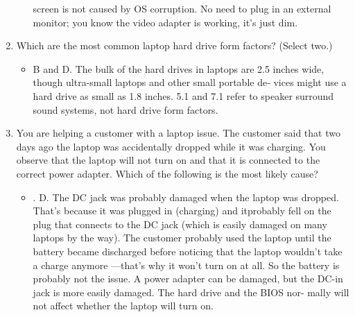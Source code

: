 \documentclass{article}
\begin{document}
\begin{enumerate}
\begin{itemize}
screen is not caused by OS corruption. No need to plug in an
external monitor; you know the video adapter is working, it’s
just dim.
     \end{itemize}
     \item Which are the most common laptop hard drive form factors?
(Select two.)
     \begin{itemize}
         \item B and D. The bulk of the hard drives in laptops are 2.5 inches
wide, though ultra-small laptops and other small portable de‐
vices might use a hard drive as small as 1.8 inches. 5.1 and 7.1
refer to speaker surround sound systems, not hard drive form
factors.
     \end{itemize}
     \item You are helping a customer with a laptop issue. The customer
said that two days ago the laptop was accidentally dropped
while it was charging. You observe that the laptop will not turn
on and that it is connected to the correct power adapter. Which
of the following is the most likely cause?
     \begin{itemize}
         \item . D. The DC jack was probably damaged when the laptop was
dropped. That’s because it was plugged in (charging) and itprobably fell on the plug that connects to the DC jack (which
is easily damaged on many laptops by the way). The customer
probably used the laptop until the battery became discharged
before noticing that the laptop wouldn’t take a charge anymore
—that’s why it won’t turn on at all. So the battery is probably
not the issue. A power adapter can be damaged, but the DC-in
jack is more easily damaged. The hard drive and the BIOS nor‐
mally will not affect whether the laptop will turn on.
     \end{itemize}
\end{enumerate}
\end{document}
